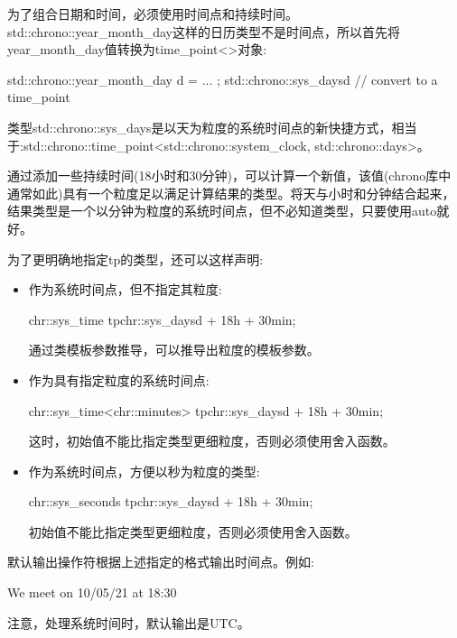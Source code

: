 为了组合日期和时间，必须使用时间点和持续时间。std::chrono::year\_month\_day这样的日历类型不是时间点，所以首先将year\_month\_day值转换为time\_point<>对象:

\begin{cpp}
std::chrono::year_month_day d = ... ;
std::chrono::sys_days{d} // convert to a time_point
\end{cpp}

类型std::chrono::sys\_days是以天为粒度的系统时间点的新快捷方式，相当于:std::chrono::time\_point<std::chrono::system\_clock, std::chrono::days>。

通过添加一些持续时间(18小时和30分钟)，可以计算一个新值，该值(chrono库中通常如此)具有一个粒度足以满足计算结果的类型。将天与小时和分钟结合起来，结果类型是一个以分钟为粒度的系统时间点，但不必知道类型，只要使用auto就好。

为了更明确地指定tp的类型，还可以这样声明:

\begin{itemize}
\item
作为系统时间点，但不指定其粒度:

\begin{cpp}
chr::sys_time tp{chr::sys_days{d} + 18h + 30min};
\end{cpp}

通过类模板参数推导，可以推导出粒度的模板参数。

\item
作为具有指定粒度的系统时间点:

\begin{cpp}
chr::sys_time<chr::minutes> tp{chr::sys_days{d} + 18h + 30min};
\end{cpp}

这时，初始值不能比指定类型更细粒度，否则必须使用舍入函数。

\item
作为系统时间点，方便以秒为粒度的类型:

\begin{cpp}
chr::sys_seconds tp{chr::sys_days{d} + 18h + 30min};
\end{cpp}

初始值不能比指定类型更细粒度，否则必须使用舍入函数。
\end{itemize}

默认输出操作符根据上述指定的格式输出时间点。例如:

\begin{shell}
We meet on 10/05/21 at 18:30
\end{shell}

注意，处理系统时间时，默认输出是UTC。

